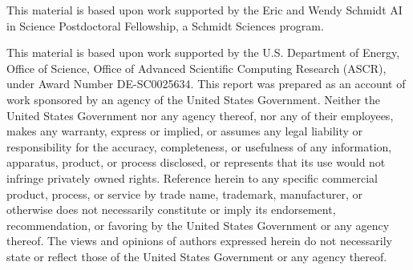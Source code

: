 This material is based upon work supported by the Eric and Wendy Schmidt AI in Science Postdoctoral Fellowship, a Schmidt Sciences program.

This material is based upon work supported by the U.S. Department of Energy, Office of Science, Office of Advanced Scientific Computing Research (ASCR), under Award Number DE-SC0025634.
This report was prepared as an account of work sponsored by an agency of the United States Government.
Neither the United States Government nor any agency thereof, nor any of their employees, makes any warranty, express or implied, or assumes any legal liability or responsibility for the accuracy, completeness, or usefulness of any information, apparatus, product, or process disclosed, or represents that its use would not infringe privately owned rights.
Reference herein to any specific commercial product, process, or service by trade name, trademark, manufacturer, or otherwise does not necessarily constitute or imply its endorsement, recommendation, or favoring by the United States Government or any agency thereof.
The views and opinions of authors expressed herein do not necessarily state or reflect those of the United States Government or any agency thereof.
